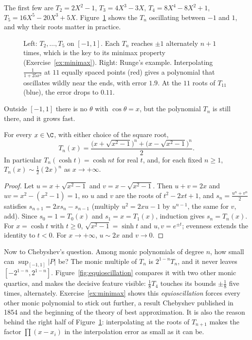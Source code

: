 The first few are $T_2=2X^2-1$, $T_3=4X^3-3X$, $T_4=8X^4-8X^2+1$, $T_5=16X^5-20X^3+5X$. Figure~\ref{fig:chebyshev} shows the $T_n$ oscillating between $-1$ and $1$, and why their roots matter in practice.

\begin{figure}[ht]
\centering
{}
\caption{Left: $T_2,\dots,T_5$ on $[-1,1]$. Each $T_n$ reaches $\pm1$ alternately $n+1$ times, which is the key to its minimax property (Exercise~\ref{ex:minimax}). Right: Runge's example. Interpolating $\frac1{1+25x^2}$ at $11$ equally spaced points (red) gives a polynomial that oscillates wildly near the ends, with error $1.9$. At the $11$ roots of $T_{11}$ (blue), the error drops to $0.11$.}
\label{fig:chebyshev}
\end{figure}

Outside $[-1,1]$ there is no $\theta$ with $\cos\theta=x$, but the polynomial $T_n$ is still there, and it grows fast.

\begin{propositionx}
For every $x\in\C$, with either choice of the square root,
\[
T_n(x)=\frac{\bigl(x+\sqrt{x^2-1}\bigr)^n+\bigl(x-\sqrt{x^2-1}\bigr)^n}2.
\]
In particular $T_n(\cosh t)=\cosh nt$ for real $t$, and, for each fixed $n\ge1$, $T_n(x)\sim\frac12(2x)^n$ as $x\to+\infty$.
\end{propositionx}
\begin{proof}
Let $u=x+\sqrt{x^2-1}$ and $v=x-\sqrt{x^2-1}$. Then $u+v=2x$ and $uv=x^2-(x^2-1)=1$, so $u$ and $v$ are the roots of $t^2-2xt+1$, and
$s_n=\frac{u^n+v^n}2$ satisfies $s_{n+1}=2xs_n-s_{n-1}$ (multiply $u^2=2xu-1$ by $u^{n-1}$, the same for $v$, add). Since $s_0=1=T_0(x)$ and
$s_1=x=T_1(x)$, induction gives $s_n=T_n(x)$. For $x=\cosh t$ with $t\ge0$, $\sqrt{x^2-1}=\sinh t$ and $u,v=e^{\pm t}$; evenness extends the identity to $t<0$. For $x\to+\infty$, $u\sim2x$ and $v\to0$.
\end{proof}

Now to Chebyshev's question. Among monic polynomials of degree $n$, how small can $\sup_{[-1,1]}|P|$ be? The monic multiple of $T_n$ is
$2^{1-n}T_n$, and it never leaves $[-2^{1-n},2^{1-n}]$. Figure~\ref{fig:equioscillation} compares it with two other monic quartics, and makes the
decisive feature visible: $\frac18T_4$ touches its bounds $\pm\frac18$ five times, alternately. Exercise~\ref{ex:minimax} shows this
\emph{equioscillation} forces every other monic polynomial to stick out further, a result Chebyshev published in 1854 and the beginning of the
theory of best approximation. It is also the reason behind the right half of Figure~\ref{fig:chebyshev}: interpolating at the roots of $T_{n+1}$
makes the factor $\prod(x-x_i)$ in the interpolation error as small as it can be.

